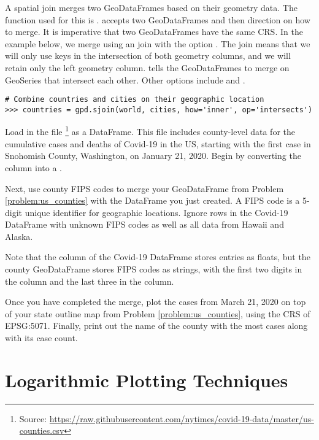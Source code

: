 A spatial join merges two GeoDataFrames based on their geometry data.
The function used for this is .
 accepts two GeoDataFrames and then direction on how to merge.
It is imperative that two GeoDataFrames have the same CRS.
In the example below, we merge using an  join with the option .
The  join means that we will only use keys in the intersection of both geometry columns, and we will retain only the left geometry column.
 tells the GeoDataFrames to merge on GeoSeries that intersect each other.
Other options include  and .

\begin{lstlisting}
# Combine countries and cities on their geographic location
>>> countries = gpd.sjoin(world, cities, how='inner', op='intersects')
\end{lstlisting}

\begin{problem}
Load in the file \footnote{Source: \url{https://raw.githubusercontent.com/nytimes/covid-19-data/master/us-counties.csv}} as a DataFrame.
This file includes county-level data for the cumulative cases and deaths of Covid-19 in the US, starting with the first case in Snohomish County, Washington, on January 21, 2020.
Begin by converting the  column into a .

Next, use county FIPS codes to merge your GeoDataFrame from Problem \ref{problem:us_counties} with the DataFrame you just created.
A FIPS code is a 5-digit unique identifier for geographic locations.
Ignore rows in the Covid-19 DataFrame with unknown FIPS codes as well as all data from Hawaii and Alaska.

Note that the  column of the Covid-19 DataFrame stores entries as floats, but the county GeoDataFrame stores FIPS codes as strings, with the first two digits in the  column and the last three in the  column.

Once you have completed the merge, plot the cases from March 21, 2020 on top of your state outline map from Problem \ref{problem:us_counties}, using the CRS of EPSG:5071.
Finally, print out the name of the county with the most cases along with its case count.
\label{problem:merge_covid}
\end{problem}

\section*{Logarithmic Plotting Techniques} %

